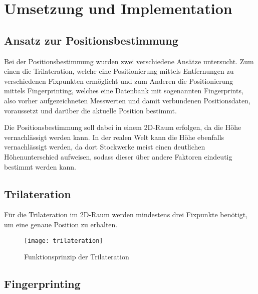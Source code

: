 \chapter{Umsetzung und Implementation}
\label{chap:implementation}

\section{Ansatz zur Positionsbestimmung}
\label{sec:implementation:positioning}
Bei der Positionsbestimmung wurden zwei verschiedene Ansätze untersucht. Zum einen die Trilateration, welche eine Positionierung mittels Entfernungen zu verschiedenen Fixpunkten ermöglicht und zum Anderen die Positionierung mittels Fingerprinting, welches eine Datenbank mit sogenannten Fingerprints, also vorher aufgezeichneten Messwerten und damit verbundenen Positionsdaten, voraussetzt und darüber die aktuelle Position bestimmt.

Die Positionsbestimmung soll dabei in einem 2D-Raum erfolgen, da die Höhe vernachlässigt werden kann. In der realen Welt kann die Höhe ebenfalls vernachlässigt werden, da dort Stockwerke meist einen deutlichen Höhenunterschied aufweisen, sodass dieser über andere Faktoren eindeutig bestimmt werden kann.


\section{Trilateration}
\label{sec:implementation:trilateration}
Für die Trilateration im 2D-Raum werden mindestens drei Fixpunkte benötigt, um eine genaue Position zu erhalten.

\begin{figure}[htb!]
	\centering
	\texttt{[image: trilateration]}
	\caption{Funktionsprinzip der Trilateration}
	\label{trilateration}
\end{figure}


\section{Fingerprinting}
\label{sec:implementation:fingerprinting}
